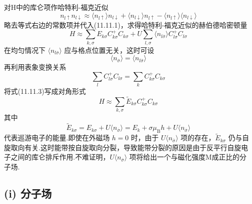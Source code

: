 对H中的库仑项作哈特利-福克近似
\begin{equation}
  n_{l\uparrow}n_{l\downarrow}\approx\langle n_{l\uparrow}\rangle n_{l\downarrow}
  +\langle n_{l\downarrow}\rangle n_{l\uparrow}-\langle n_{l\uparrow}\rangle\langle n_{l\downarrow}\rangle
\end{equation}
略去等式右边的常数项并代入(11.11.1)，求得哈特利-福克近似的赫伯德哈密顿量
\begin{equation}
  H\approx\sum_{k,\sigma}E_{k\sigma}C_{k\sigma}^{+}C_{k\sigma}
  +U\sum_{l,\sigma}\langle n_{l\overline{\sigma}}\rangle C_{l\sigma}^{+}C_{l\sigma}
\end{equation}
在均匀情况下 $\langle n_{l\overline{\sigma}}\rangle$ 应与格点位置无关，这时可设
\begin{equation}
  \langle n_{\overline{\sigma}}\rangle=\langle n_{l\overline{\sigma}}\rangle
\end{equation}
再利用表象变换关系
\begin{equation}
  \sum_{l}C_{l\sigma}^{+}C_{l\sigma}=\sum_{k}C_{k\sigma}^{+}C_{k\sigma}
\end{equation}
将式(11.11.3)写成对角形式
\begin{equation}
  H\approx\sum_{k,\sigma}\widetilde{E}_{k\sigma}C_{k\sigma}^{+}C_{k\sigma}
\end{equation}
其中
\begin{equation}
  \widetilde{E}_{k\sigma}=E_{k\sigma}+U\langle n_{\overline{\sigma}}\rangle
  =E_{k}+\sigma\mu_{\mathrm{B}}h+U\langle n_{\overline{\sigma}}\rangle
\end{equation}
代表巡游电子的能量.即使在外磁场 $h=0$ 时，由于 $U\langle n_{\overline{\sigma}}\rangle$ 项的存在，$\widetilde{E}_{k\sigma}$ 仍与自旋取向有关.这时能带按自旋取向分裂，导致能带分裂的原因是由于反平行自旋电子之间的库仑排斥作用.不难证明，$U\langle n_{\overline{\sigma}}\rangle$ 项将给出一个与磁化强度M成正比的分子场.

\subsection*{(i) 分子场}

